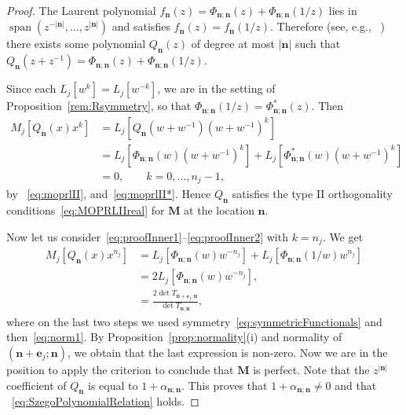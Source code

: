 \documentclass[reqno,centertags,11pt,draft]{amsart}
\begin{document}
\begin{proof}
    The Laurent polynomial $f_{\bm{n}}(z)=\Phi_{\bm{n};\bm{n}}(z) + \Phi_{\bm{n};\bm{n}}(1/z)$ lies in $\operatorname{span}(z^{-|\bm{n}|},\ldots,z^{|\bm{n}|})$ and satisfies $f_{\bm{n}}(z) = f_{\bm{n}}(1/z)$. Therefore (see, e.g., ~\cite[Lem 13.1.4]{OPUC2}) there exists some polynomial $Q_{\bm{n}}(z)$ of degree at most $|\bm{n}|$ such that $Q_{\bm{n}}(z+z^{-1})= \Phi_{\bm{n};\bm{n}}(z) + \Phi_{\bm{n};\bm{n}}(1/z)$.


    Since each $L_j[w^k] = L_j[w^{-k}]$, %
    we are in the setting of Proposition~\ref{rem:Rsymmetry}, so that $\Phi_{\bm{n};\bm{n}}(1/z)=\Phi_{\bm{n};\bm{n}}^*(z)$. 
    Then 
    \begin{align}
    \label{eq:proofInner1}
     M_j[Q_{\bm{n}}(x)x^k]& =  L_j[ Q_{\bm{n}}(w+w^{-1})(w+w^{-1})^k]
    \\
    \label{eq:proofInner2}
    &= 
    L_j[ \Phi_{\bm{n};\bm{n}}(w)(w+w^{-1})^k] 
    +L_j[\Phi^*_{\bm{n};\bm{n}}(w)(w+w^{-1})^k] 
    \\
    \label{eq:proofInner3}
    & 
    =0, \qquad k = 0,\dots,n_j-1,
    \end{align}
    by ~\eqref{eq:moprlII}, and~\eqref{eq:moprlII*}.
    Hence $Q_{\bm{n}}$ satisfies the type II orthogonality conditions~\eqref{eq:MOPRLIIreal} for $\bm{M}$ at the location $\bm{n}$. 

    Now let us consider~\eqref{eq:proofInner1}--\eqref{eq:proofInner2} with $k=n_j$. We get 
    \begin{align}
     M_j[Q_{\bm{n}}(x)x^{n_j}]
    & 
    =L_j[ \Phi_{\bm{n};\bm{n}}(w) w^{-n_j}] 
    +L_j[\Phi_{\bm{n};\bm{n}}(1/w) w^{n_j}] 
    \\&\label{eq:computation for a}
    = 2L_j[ \Phi_{\bm{n};\bm{n}}(w) w^{-n_j}] ,
    \\&
    \label{eq:lastQnorm}
    = \frac{2\det T_{\bm{n}+\bm{e}_j;\bm{n}}}{\det T_{\bm{n};\bm{n}}},
    \end{align}
    where on the last two steps we used symmetry~\eqref{eq:symmetricFunctionals} and then~\eqref{eq:norm1}. By Proposition~\ref{prop:normality}{(i)} and normality of $(\bm{n}+\bm{e}_j;\bm{n})$, we obtain that the last expression is non-zero.
    Now we are in the position to apply the criterion  
    \cite[Thm 2.19]{KVChristoffel} 
    to conclude that $\bm{M}$ is perfect.  
    Note that the $z^{|\bm{n}|}$ coefficient of $Q_{\bm{n}}$ is equal to $1+\alpha_{\bm{n};\bm{n}}$. This proves that $1+\alpha_{\bm{n};\bm{n}}\ne 0$ and that ~\eqref{eq:SzegoPolynomialRelation} holds.  


\end{proof}
\end{document}
